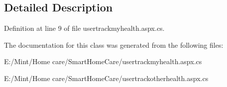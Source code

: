 \subsection{Detailed Description}


Definition at line 9 of file usertrackmyhealth.\-aspx.\-cs.



The documentation for this class was generated from the following files\-:\begin{DoxyCompactItemize}
\item 
E\-:/\-Mint/\-Home care/\-Smart\-Home\-Care/usertrackmyhealth.\-aspx.\-cs\item 
E\-:/\-Mint/\-Home care/\-Smart\-Home\-Care/usertrackotherhealth.\-aspx.\-cs\end{DoxyCompactItemize}
